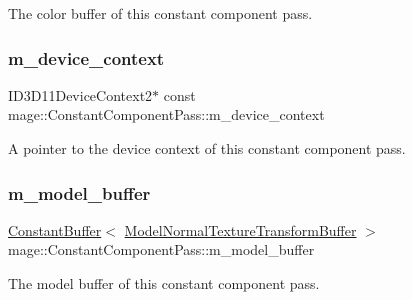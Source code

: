 The color buffer of this constant component pass. \hypertarget{classmage_1_1_constant_component_pass_af5a2ec9190b657a0e5cf3786c35f0336}{}\label{classmage_1_1_constant_component_pass_af5a2ec9190b657a0e5cf3786c35f0336} 
\subsubsection{\texorpdfstring{m\+\_\+device\+\_\+context}{m\_device\_context}}
{\footnotesize\ttfamily I\+D3\+D11\+Device\+Context2$\ast$ const mage\+::\+Constant\+Component\+Pass\+::m\+\_\+device\+\_\+context\hspace{0.3cm}{\ttfamily [private]}}

A pointer to the device context of this constant component pass. \hypertarget{classmage_1_1_constant_component_pass_a012197b5473955c356d2fbc48f9d3e8b}{}\label{classmage_1_1_constant_component_pass_a012197b5473955c356d2fbc48f9d3e8b} 
\subsubsection{\texorpdfstring{m\+\_\+model\+\_\+buffer}{m\_model\_buffer}}
{\footnotesize\ttfamily \hyperlink{structmage_1_1_constant_buffer}{Constant\+Buffer}$<$ \hyperlink{structmage_1_1_model_normal_texture_transform_buffer}{Model\+Normal\+Texture\+Transform\+Buffer} $>$ mage\+::\+Constant\+Component\+Pass\+::m\+\_\+model\+\_\+buffer\hspace{0.3cm}{\ttfamily [private]}}

The model buffer of this constant component pass. \hypertarget{classmage_1_1_constant_component_pass_a6847024cc7d3b7f882e16c714c7ca8c8}{}\label{classmage_1_1_constant_component_pass_a6847024cc7d3b7f882e16c714c7ca8c8} 
